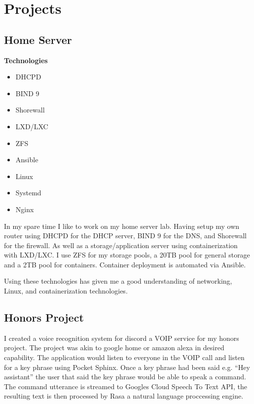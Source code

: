\documentclass[a4paper]{cv}
\begin{document}
\begin{minipage}[t]{0.70\textwidth}
\section{Projects}
\subsection{Home Server}
\begin{multicols}{4}
{\bfseries Technologies}\vfill\null
\columnbreak
\begin{itemize} 
    \item DHCPD
    \item BIND 9
    \item Shorewall
    \item LXD/LXC
    \item ZFS
    \item Ansible
    \item Linux
    \item Systemd
    \item Nginx
\end{itemize}
\end{multicols}
In my spare time I like to work on my home server lab. Having setup my own router using DHCPD for the DHCP server, BIND 9 for the DNS, and Shorewall for the firewall. As well as a storage/application server using containerization with LXD/LXC. I use ZFS for my storage pools, a 20TB pool for general storage and a 2TB pool for containers. Container deployment is automated via Ansible.

Using these technologies has given me a good understanding of networking, Linux, and containerization technologies.

\sectionspace
\subsection{Honors Project}
I created a voice recognition system for discord a VOIP service for my honors project. The project was akin to google home or amazon alexa in desired capability. The application would listen to everyone in the VOIP call and listen for a key phrase using Pocket Sphinx. Once a key phrase had been said e.g. ``Hey assistant'' the user that said the key phrase would be able to speak a command. The command utterance is streamed to Googles Cloud Speech To Text API, the resulting text is then processed by Rasa a natural language proccessing engine.
\end{minipage}
\end{document}
